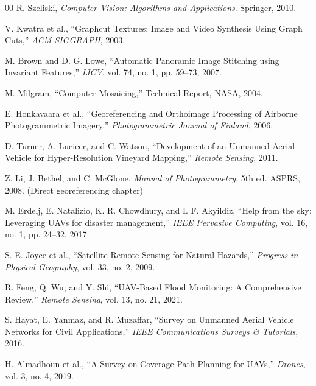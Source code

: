 \documentclass[conference]{IEEEtran}
\begin{document}
\begin{thebibliography}{00}
R. Szeliski, \textit{Computer Vision: Algorithms and Applications}. Springer, 2010.

V. Kwatra et al., ``Graphcut Textures: Image and Video Synthesis Using Graph Cuts,'' \textit{ACM SIGGRAPH}, 2003.

M. Brown and D. G. Lowe, ``Automatic Panoramic Image Stitching using Invariant Features,'' \textit{IJCV}, vol. 74, no. 1, pp. 59--73, 2007.

M. Milgram, ``Computer Mosaicing,'' Technical Report, NASA, 2004.

E. Honkavaara et al., ``Georeferencing and Orthoimage Processing of Airborne Photogrammetric Imagery,'' \textit{Photogrammetric Journal of Finland}, 2006.

D. Turner, A. Lucieer, and C. Watson, ``Development of an Unmanned Aerial Vehicle for Hyper-Resolution Vineyard Mapping,'' \textit{Remote Sensing}, 2011.

Z. Li, J. Bethel, and C. McGlone, \textit{Manual of Photogrammetry}, 5th ed. ASPRS, 2008. (Direct georeferencing chapter)

M. Erdelj, E. Natalizio, K. R. Chowdhury, and I. F. Akyildiz, ``Help from the sky: Leveraging UAVs for disaster management,'' \textit{IEEE Pervasive Computing}, vol. 16, no. 1, pp. 24--32, 2017.

S. E. Joyce et al., ``Satellite Remote Sensing for Natural Hazards,'' \textit{Progress in Physical Geography}, vol. 33, no. 2, 2009.

R. Feng, Q. Wu, and Y. Shi, ``UAV-Based Flood Monitoring: A Comprehensive Review,'' \textit{Remote Sensing}, vol. 13, no. 21, 2021.

S. Hayat, E. Yanmaz, and R. Muzaffar, ``Survey on Unmanned Aerial Vehicle Networks for Civil Applications,'' \textit{IEEE Communications Surveys \& Tutorials}, 2016.

H. Almadhoun et al., ``A Survey on Coverage Path Planning for UAVs,'' \textit{Drones}, vol. 3, no. 4, 2019.


\end{thebibliography}
\end{document}
